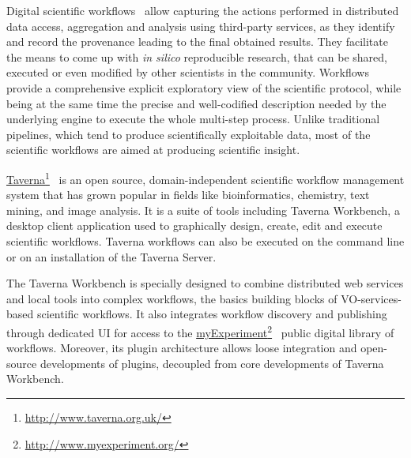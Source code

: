 \documentclass[final,authoryear,5p,times,twocolumn]{elsarticle}
\newcommand{\urlsamefont}[1]{\urlstyle{same}\url{#1}}
\newcommand{\hrefnote}[2]{\href{#1}{#2}\footnote{\urlsamefont{#1}}}
\begin{document}
Digital scientific workflows~\citep{Gil2007, Gil2008} allow capturing the actions performed in distributed data access, aggregation and analysis using third-party services, as they identify and record the provenance leading to the final obtained results. They facilitate the means to come up with \emph{in silico} reproducible research, that can be shared, executed or even modified by other scientists in the community. Workflows provide a comprehensive explicit exploratory view of the scientific protocol, while being at the same time the precise and well-codified description needed by the underlying engine to execute the whole multi-step process. Unlike traditional pipelines, which tend to produce scientifically exploitable data, most of the scientific workflows are aimed at producing scientific insight.

\hrefnote{http://www.taverna.org.uk/}{Taverna}~\citep{Wolstencroft01072013} is an open source, domain-independent scientific workflow management system that has grown popular in fields like bioinformatics, chemistry, text mining, and image analysis. It is a suite of tools including Taverna Workbench, a desktop client application used to graphically design, create, edit and execute scientific workflows. Taverna workflows can also be executed on the command line or on an installation of the Taverna Server.

The Taverna Workbench is specially designed to combine distributed web services and local tools into complex workflows, the basics building blocks of VO-services-based scientific workflows. It also integrates workflow discovery and publishing through dedicated UI for access to the \hrefnote{http://www.myexperiment.org/}{myExperiment}~\citep{Goble2010} public digital library of workflows. Moreover, its plugin architecture allows loose integration and open-source developments of plugins, decoupled from core developments of Taverna Workbench.
\end{document}
